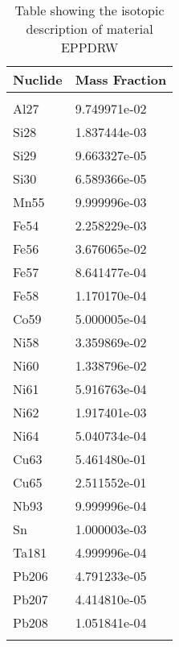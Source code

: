 \begin{centering}
\begin{longtable}[ht!]
\caption{Table showing the isotopic description of material M602}
\label{table:material_M602}
\end{longtable}\clearpage

\begin{longtable}[ht!]
{ p{} | p{} }
\hline
Nuclide & Mass Fraction\\
\hline
\\
Al27 & 9.749971e-02\\
Si28 & 1.837444e-03\\
Si29 & 9.663327e-05\\
Si30 & 6.589366e-05\\
Mn55 & 9.999996e-03\\
Fe54 & 2.258229e-03\\
Fe56 & 3.676065e-02\\
Fe57 & 8.641477e-04\\
Fe58 & 1.170170e-04\\
Co59 & 5.000005e-04\\
Ni58 & 3.359869e-02\\
Ni60 & 1.338796e-02\\
Ni61 & 5.916763e-04\\
Ni62 & 1.917401e-03\\
Ni64 & 5.040734e-04\\
Cu63 & 5.461480e-01\\
Cu65 & 2.511552e-01\\
Nb93 & 9.999996e-04\\
Sn & 1.000003e-03\\
Ta181 & 4.999996e-04\\
Pb206 & 4.791233e-05\\
Pb207 & 4.414810e-05\\
Pb208 & 1.051841e-04\\

\caption{Table showing the isotopic description of material EPPDRW}
\label{table:material_EPPDRW}
\end{longtable}\clearpage


\end{centering}
